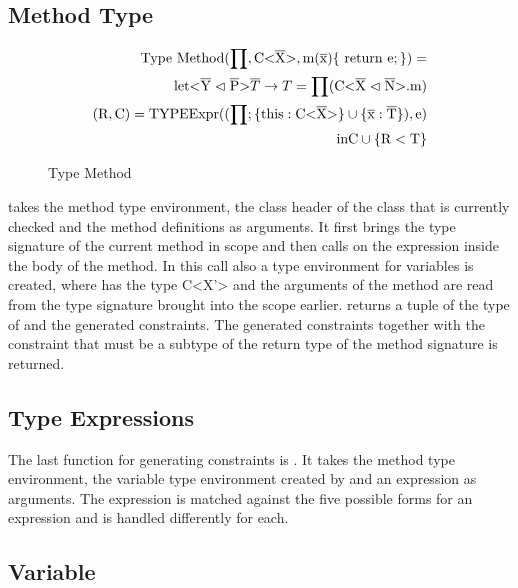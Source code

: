 \subsection{Method Type}

\begin{figure}[H]
    \begin{align*}
        \text{Type Method}(\prod, \text{C<} \overline{\text{X}} \text{>}, \text{m} ( \overline{\text{x}} ) \{ \ \text{return e}; \} ) = \\
        \text{let} \text{<} \overline{\text{Y}} \vartriangleleft \overline{\text{P}} \text{>} \overline{T} \to T = \prod ( \text{C} \text{<} \overline{\text{X}} \vartriangleleft \overline{\text{N}} \text{>} \text{.m} ) \\
        ( \text{R}, \text{C} ) = \text{TYPEExpr} (( \prod; \{ \text{this} : \text{C<} \overline{\text{X}} \text{>} \} \cup \{ \overline{\text{x}} : \overline{\text{T}} \} ) , \text{e} ) \\
        \text{in} \text{C} \cup \{ \text{R} < \text{T} \}
    \end{align*}
    \caption{Type Method}
    \label{methodtype}
\end{figure}

 takes the method type environment, the class header  of the class that is currently checked and the method definitions as arguments.
It first brings the type signature of the current method in scope and then calls  on the expression  inside the body of the method. In this call also a type environment for variables is created, where  has the type C<X'> and the arguments of the method are read from the type signature brought into the scope earlier.
 returns a tuple of the type  of  and the generated constraints. The generated constraints together with the constraint that  must be a subtype of the return type of the method signature is returned.

\subsection{Type Expressions}
The last function for generating constraints is . It takes the method type environment, the variable type environment created by  and an expression  as arguments.
The expression  is matched against the five possible forms for an expression and is handled differently for each.

\subsection{Variable}

